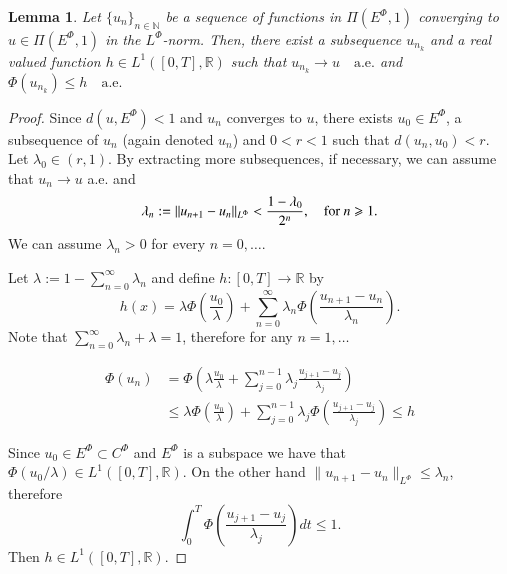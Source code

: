 \documentclass[twoside]{article}
\newtheorem{lem}[thm]{Lemma}
\theoremstyle{remark}
\newcommand{\orlnor}{\|_{L^{\Phi}}}
\newcommand{\lphi}{L^{\Phi}}
\newcommand{\ephi}{E^{\Phi}}
\newcommand{\claseor}{C^{\Phi}}
\newcommand{\rr}{\mathbb{R}}
\renewcommand{\leq}{\leqslant}
\renewcommand{\geq}{\geqslant}
\begin{document}
\begin{lem}\label{segundo lema}
Let  $\{{u}_n\}_{n\in \mathbb{N}}$ be a sequence of  functions in $\Pi(\ephi,1)$ converging to  ${u}\in \Pi(\ephi,1)$  in the $\lphi$-norm. Then, there exist a subsequence
${u}_{n_k}$ and a real valued function $h\in L^1([0,T],\rr)$ such that ${u}_{n_k}\rightarrow {u} \quad\text{a.e.}$ and $\Phi({u}_{n_k})\leq h\quad\text{a.e.}$
\end{lem}



\begin{proof}
Since $d({u},\ephi)<1$ and ${u}_n$ converges to ${u}$, there exists $u_0\in\ephi$, a subsequence of $u_n$ (again denoted $u_n$) and $0<r<1$  such that $d(u_n,u_0)<r$. Let $\lambda_0\in (r,1)$.  By extracting more subsequences, if necessary, we can assume that $u_n\to u$ a.e. and
\[\lambda_n:=\|{u}_{n+1}-{u}_{n}\orlnor<\frac{1-\lambda_0}{2^n},\quad\hbox{for } n\geq 1.\]
We can assume $\lambda_n>0$ for every $n=0,\ldots$.

Let $\lambda:=1-\sum_{n=0}^{\infty}\lambda_n$ and define $h:[0,T]\rightarrow\mathbb{R}$  by
\begin{equation}\label{eq:serie} h(x)= \lambda\Phi\left(\frac{u_0}{\lambda}\right)+\sum_{n=0}^{\infty}\lambda_n\Phi\left(\frac{u_{n+1}-u_n}{\lambda_n}\right).
\end{equation}
Note that $\sum_{n=0}^{\infty}\lambda_n+\lambda=1$, therefore for any $n=1,\ldots$


\[
 \begin{split}
   \Phi(u_n) &=\Phi\left(  \lambda\frac{u_0}{\lambda}+   \sum_{j=0}^{n-1}\lambda_j\frac{u_{j+1}-u_j}{\lambda_j} \right)\\
   &\leq
   \lambda\Phi\left(\frac{u_0}{\lambda}\right)+\sum_{j=0}^{n-1}\lambda_j\Phi\left(\frac{u_{j+1}-u_j}{\lambda_j}\right) \leq h
 \end{split}
\]

Since $u_0\in\ephi\subset \claseor$ and $\ephi$ is a subspace we have that $\Phi(u_0/\lambda)\in L^1([0,T],\rr)$. 
On the other hand $\|u_{n+1}-u_n\orlnor \leq \lambda_n$, therefore
\[
 \int_0^T\Phi\left(\frac{u_{j+1}-u_j}{\lambda_j}\right)dt\leq 1.
\]
Then $h\in L^1([0,T],\rr)$.


\end{proof}
\end{document}
